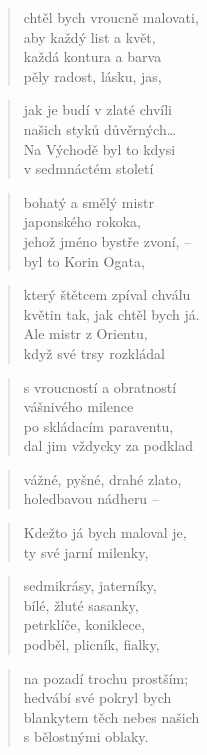 \documentclass{book}
\begin{document}
\begin{verse}
chtěl bych vroucně malovati,\\
aby každý list a květ,\\
každá kontura a barva\\
pěly radost, lásku, jas,
\end{verse}
\begin{verse}
jak je budí v zlaté chvíli\\
našich styků důvěrných\ldots\\
Na Východě byl to kdysi\\
v sedmnáctém století
\end{verse}
\begin{verse}
bohatý a smělý mistr\\
japonského rokoka,\\
jehož jméno bystře zvoní, --\\
byl to Korin Ogata,
\end{verse}
\begin{verse}
který štětcem zpíval chválu\\
květin tak, jak chtěl bych já.\\
Ale mistr z Orientu,\\
když své trsy rozkládal
\end{verse}
\begin{verse}
s vroucností a obratností\\
vášnivého milence\\
po skládacím paraventu,\\
dal jim vždycky za podklad
\end{verse}
\begin{verse}
vážné, pyšné, drahé zlato,\\
holedbavou nádheru --
\end{verse}
\begin{verse}
Kdežto já bych maloval je,\\
ty své jarní milenky,
\end{verse}
\begin{verse}
sedmikrásy, jaterníky,\\
bílé, žluté sasanky,\\
petrklíče, koniklece,\\
podběl, plicník, fialky,
\end{verse}
\begin{verse}
na pozadí trochu prostším;\\
hedvábí své pokryl bych\\
blankytem těch nebes našich\\
s bělostnými oblaky.
\end{verse}
\end{document}

